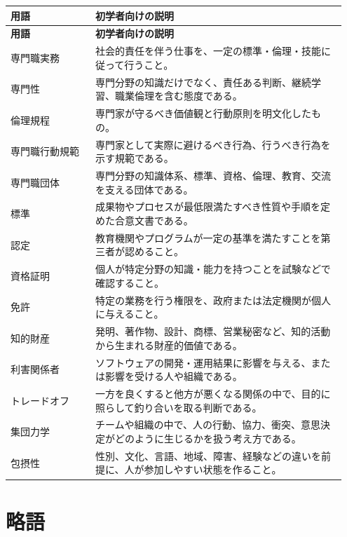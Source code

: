 \documentclass[uplatex,dvipdfmx,a4paper,11pt]{jsarticle}
\begin{document}
\begin{center}
\small
\begin{longtable}{p{0.24\linewidth}p{0.71\linewidth}}
\toprule
\textbf{用語} & \textbf{初学者向けの説明} \\
\midrule
\endfirsthead
\toprule
\textbf{用語} & \textbf{初学者向けの説明} \\
\midrule
\endhead
専門職実務 & 社会的責任を伴う仕事を、一定の標準・倫理・技能に従って行うこと。 \\
\midrule
専門性 & 専門分野の知識だけでなく、責任ある判断、継続学習、職業倫理を含む態度である。 \\
\midrule
倫理規程 & 専門家が守るべき価値観と行動原則を明文化したもの。 \\
\midrule
専門職行動規範 & 専門家として実際に避けるべき行為、行うべき行為を示す規範である。 \\
\midrule
専門職団体 & 専門分野の知識体系、標準、資格、倫理、教育、交流を支える団体である。 \\
\midrule
標準 & 成果物やプロセスが最低限満たすべき性質や手順を定めた合意文書である。 \\
\midrule
認定 & 教育機関やプログラムが一定の基準を満たすことを第三者が認めること。 \\
\midrule
資格証明 & 個人が特定分野の知識・能力を持つことを試験などで確認すること。 \\
\midrule
免許 & 特定の業務を行う権限を、政府または法定機関が個人に与えること。 \\
\midrule
知的財産 & 発明、著作物、設計、商標、営業秘密など、知的活動から生まれる財産的価値である。 \\
\midrule
利害関係者 & ソフトウェアの開発・運用結果に影響を与える、または影響を受ける人や組織である。 \\
\midrule
トレードオフ & 一方を良くすると他方が悪くなる関係の中で、目的に照らして釣り合いを取る判断である。 \\
\midrule
集団力学 & チームや組織の中で、人の行動、協力、衝突、意思決定がどのように生じるかを扱う考え方である。 \\
\midrule
包摂性 & 性別、文化、言語、地域、障害、経験などの違いを前提に、人が参加しやすい状態を作ること。 \\
\midrule
\bottomrule
\end{longtable}
\normalsize
\end{center}

\section*{略語}
\end{document}
